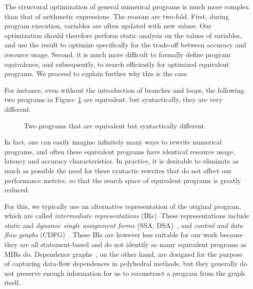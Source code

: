 The structural optimization of general numerical programs is much more complex
than that of arithmetic expressions.  The reasons are two-fold.  First,
during program execution, variables are often updated with new values.  Our
optimization should therefore perform static analysis on the values of
variables, and use the result to optimize specifically for the trade-off
between accuracy and resource usage.  Second, it is much more difficult to
formally define program equivalence, and subsequently, to search efficiently
for optimized equivalent programs.  We proceed to explain further why this is
the case.

For instance, even without the introduction of branches and loops, the
following two programs in Figure~\ref{bg:fig:equiv_progs} are equivalent, but
syntactically, they are very different.
\begin{figure}[ht]
    \centering
     \qquad \qquad
    \caption{%
        Two programs that are equivalent but syntactically different.
    }\label{bg:fig:equiv_progs}
\end{figure}

In fact, one can easily imagine infinitely many ways to rewrite numerical
programs, and often these equivalent programs have identical resource usage,
latency and accuracy characteristics.  In practice, it is desirable to
eliminate as much as possible the need for these syntactic rewrites that do not
affect our performance metrics, so that the search space of equivalent programs
is greatly reduced.

For this, we typically use an alternative representation of the original
program, which are called \emph{intermediate representations} (IRs).  These
representations include \emph{static} and \emph{dynamic single assignment
forms} (SSA, DSA)~\cite{rau92, cytron91}, and \emph{control and data flow
graphs} (CDFG)~\cite{gajski94}.  These IRs are however less suitable for
our work because they are all statement-based and do not identify as many
equivalent programs as MIRs do.  Dependence graphs~\cite{rau94}, on the other
hand, are designed for the purpose of capturing data-flow dependences in
polyhedral methods, but they generally do not preserve enough information for
us to reconstruct a program from the graph itself.


